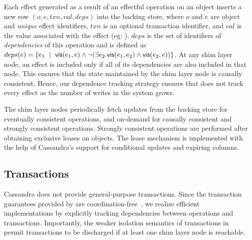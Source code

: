 Each effect generated as a result of an effectful operation on an object
inserts a new row $(o,\allowbreak e,\allowbreak txn,\allowbreak val,
\allowbreak deps)$ into the backing store, where $o$ and $e$ are object and
\emph{unique} effect identifiers, $txn$ is an optional transaction identifier,
and $val$ is the value associated with the effect (eg: ).
$deps$ is the set of identifiers of \emph{dependencies} of this operation and
is defined as $deps(e) = \{e_1 ~\mid~ {\normalfont \textsf{vis}(e_1,e)} \wedge \neg(\exists
e_2.{\normalfont \textsf{vis}(e_1,e_2)} \wedge {\normalfont \textsf{vis}(e_2,e)})\}$. At any shim layer node, an effect
is included only if all of its dependencies are also included in that node.
This ensures that the state maintained by the shim layer node is causally
consistent. Hence, our dependence tracking strategy ensures that \name does not
track every effect as the number of writes in the system grows.

The shim layer nodes periodically fetch updates from the backing store for
eventually consistent operations, and on-demand for causally consistent and
strongly consistent operations. Strongly consistent operations are performed
after obtaining exclusive leases on objects. The lease mechanism is implemented
with the help of Cassandra's support for conditional updates and expiring
columns.

\subsection{Transactions}

Cassandra does not provide general-purpose transactions. Since the transaction
guarantees provided by \name are coordination-free~\cite{BailisHAT}, we realize
efficient implementations by explicitly tracking dependencies between
operations and transactions. Importantly, the weaker isolation semantics of
transactions in \name permit transactions to be discharged if at least one shim
layer node is reachable.


